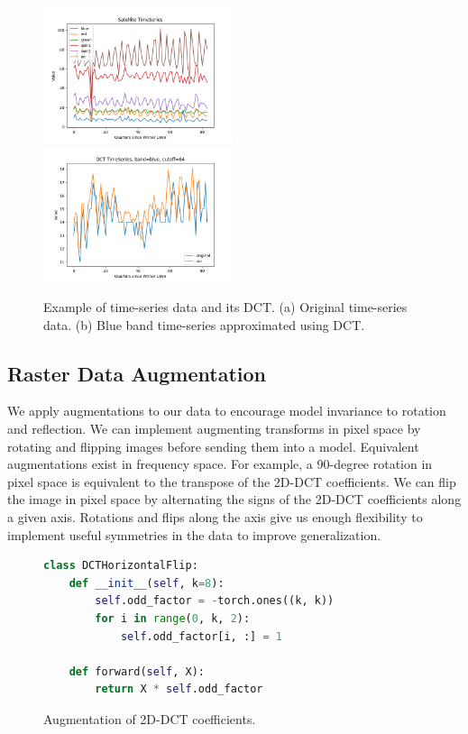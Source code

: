 \begin{figure}[h!]
  \centering
  \includegraphics[width=0.495\textwidth]{figures/6-bands.png}
  \hfill
  \includegraphics[width=0.495\textwidth]{figures/both.png}
  \caption{
    Example of time-series data and its DCT.
    (a) Original time-series data.
    (b) Blue band time-series approximated using DCT.
  }
  \label{fig:dct-timeseries}
\end{figure}
\subsection{Raster Data Augmentation}

We apply augmentations to our data to encourage model invariance to rotation and reflection.
We can implement augmenting transforms in pixel space by rotating and flipping images before sending them into a model.
Equivalent augmentations exist in frequency space.
For example, a 90-degree rotation in pixel space is equivalent to the transpose of the 2D-DCT coefficients.
We can flip the image in pixel space by alternating the signs of the 2D-DCT coefficients along a given axis.
Rotations and flips along the axis give us enough flexibility to implement useful symmetries in the data to improve generalization.

\begin{figure}
\begin{lstlisting}[language=Python,frame=single]
class DCTHorizontalFlip:
    def __init__(self, k=8):
        self.odd_factor = -torch.ones((k, k))
        for i in range(0, k, 2):
            self.odd_factor[i, :] = 1

    def forward(self, X):
        return X * self.odd_factor
\end{lstlisting}
\caption{Augmentation of 2D-DCT coefficients.}
\label{lst:augmentation}
\end{figure}